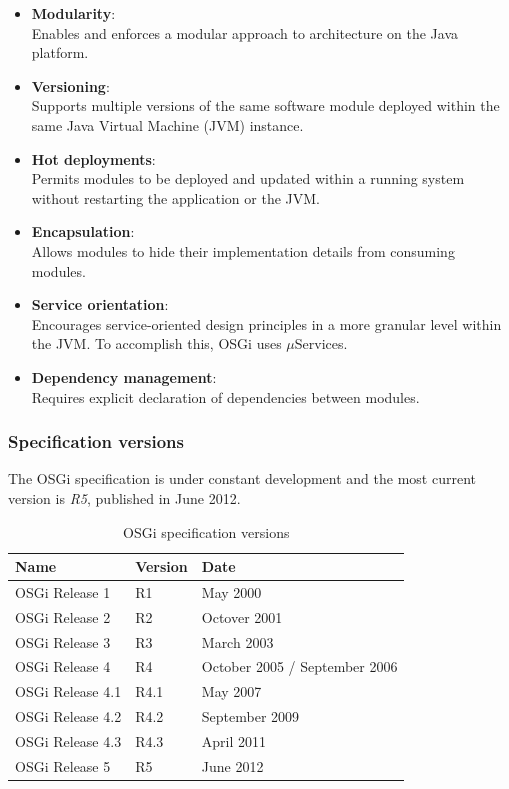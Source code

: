 \begin{itemize}
	\item \textbf{Modularity}: \\
	Enables and enforces a modular approach to architecture on the Java platform.
	\item \textbf{Versioning}: \\
	Supports multiple versions of the same software module deployed within the same Java Virtual Machine (JVM) instance.
	\item \textbf{Hot deployments}: \\
	Permits modules to be deployed and updated within a running system without restarting the application or the JVM.
	\item \textbf{Encapsulation}: \\
	Allows modules to hide their implementation details from consuming modules.
	\item \textbf{Service orientation}: \\
	Encourages service-oriented design principles in a more granular level within the JVM. To accomplish this, OSGi uses $\mu$Services.
	\item \textbf{Dependency management}: \\
	Requires explicit declaration of dependencies between modules.
\end{itemize}

\newpage
\subsubsection{Specification versions}
The \gls{OSGi} specification is under constant development and the most current version is \textit{R5}, published in June 2012.

\begin{table}[H]
\centering
\begin{tabular*}{\textwidth}{ l l l }
	\toprule
	Name & Version & Date \\
	\midrule
	OSGi Release 1 & R1 & May 2000 \\
	OSGi Release 2 & R2 & Octover 2001 \\
	OSGi Release 3 & R3 & March 2003 \\
	OSGi Release 4 & R4 & October 2005 / September 2006 \\
	OSGi Release 4.1 & R4.1 & May 2007 \\
	OSGi Release 4.2 & R4.2 & September 2009 \\
	OSGi Release 4.3 & R4.3 & April 2011 \\
	OSGi Release 5 & R5 & June 2012 \\
	\bottomrule
\end{tabular*}
\caption{OSGi specification versions}
\label{tbl:osgi-versions}
\end{table}

